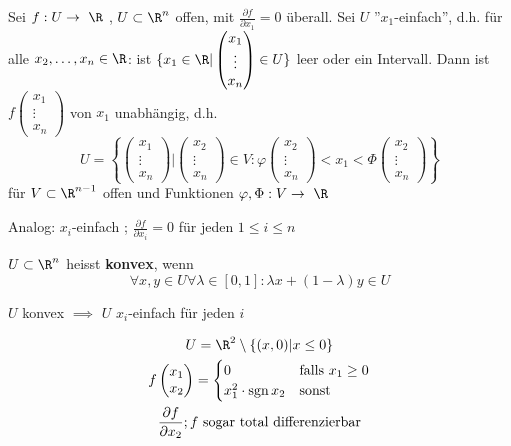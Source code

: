 \begin{satz*}
	Sei $f: U \rightarrow \R$ , $U \subset \R^n$ offen, mit $\frac{\partial f}{\partial x_1} = 0$ überall. Sei $U$ ''$x_1$-einfach'', d.h. für alle $x_2 , \dotsc , x_n \in \R$: ist $\{ x_1 \in \R | \begin{pmatrix} x_1 \\ \vdots \\ x_n \end{pmatrix} \in U \}$ leer oder ein Intervall. Dann ist $f\begin{pmatrix} x_1 \\ \vdots \\ x_n \end{pmatrix}$ von $x_1$ unabhängig, d.h.
	\[ U = \left\{ \begin{pmatrix} x_1 \\ \vdots \\ x_n \end{pmatrix} | \begin{pmatrix} x_2 \\ \vdots \\ x_n \end{pmatrix} \in V : \varphi\begin{pmatrix} x_2 \\ \vdots \\ x_n \end{pmatrix} < x_1 < \Phi\begin{pmatrix} x_2 \\ \vdots \\ x_n \end{pmatrix} \right\} \]
	für $V \subset \R^{n-1}$ offen und Funktionen $\varphi , \Phi : V \rightarrow \R$
	
	Analog: $x_i$-einfach ; $\frac{\partial f}{\partial x_i} = 0$ für jeden $1 \leq i \leq n$
\end{satz*}
\begin{bem}
	$U \subset \R^n$ heisst \textbf{konvex}, wenn
	\[ \forall x, y \in U \forall \lambda \in [ 0 , 1 ] : \lambda x + ( 1 - \lambda ) y \in U \]
\end{bem}
\begin{bem}
	$U$ konvex $\implies$ $U$ $x_i$-einfach für jeden $i$
\end{bem}
\begin{bsp*}
	\begin{gather*}
		U = \R^2 \setminus \{ (x,0) | x \leq 0 \} \\
		f\begin{pmatrix} x_1 \\ x_2 \end{pmatrix} = \begin{cases}
			0				&\text{falls } x_1 \geq 0	\\
			x_1^2 \cdot \sgn x_2	&\text{sonst}
		\end{cases} \\
		\frac{\partial f}{\partial x_2} ; f \text{ sogar total differenzierbar}
	\end{gather*}
\end{bsp*}
